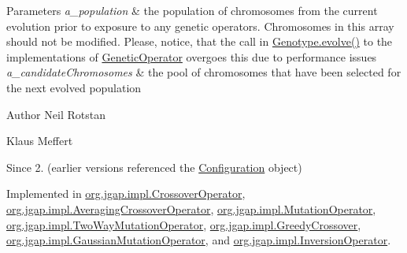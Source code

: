 \begin{DoxyParams}{Parameters}
{\em a\-\_\-population} & the population of chromosomes from the current evolution prior to exposure to any genetic operators. Chromosomes in this array should not be modified. Please, notice, that the call in \hyperlink{classorg_1_1jgap_1_1_genotype_a54a6791fbb6e13920e79f4e2dd719eb4}{Genotype.\-evolve()} to the implementations of \hyperlink{interfaceorg_1_1jgap_1_1_genetic_operator}{Genetic\-Operator} overgoes this due to performance issues \\
\hline
{\em a\-\_\-candidate\-Chromosomes} & the pool of chromosomes that have been selected for the next evolved population\\
\hline
\end{DoxyParams}
\begin{DoxyAuthor}{Author}
Neil Rotstan 

Klaus Meffert 
\end{DoxyAuthor}
\begin{DoxySince}{Since}
2. (earlier versions referenced the \hyperlink{classorg_1_1jgap_1_1_configuration}{Configuration} object) 
\end{DoxySince}


Implemented in \hyperlink{classorg_1_1jgap_1_1impl_1_1_crossover_operator_a271b82e98b398a42b576c956350d905e}{org.\-jgap.\-impl.\-Crossover\-Operator}, \hyperlink{classorg_1_1jgap_1_1impl_1_1_averaging_crossover_operator_a6acef66720d9c62e2be2f570bd0755f9}{org.\-jgap.\-impl.\-Averaging\-Crossover\-Operator}, \hyperlink{classorg_1_1jgap_1_1impl_1_1_mutation_operator_a4a1c852770559bba4ffa3e9718f4a0d8}{org.\-jgap.\-impl.\-Mutation\-Operator}, \hyperlink{classorg_1_1jgap_1_1impl_1_1_two_way_mutation_operator_a53ac73cd4e6b197e6756d4efe02bd01e}{org.\-jgap.\-impl.\-Two\-Way\-Mutation\-Operator}, \hyperlink{classorg_1_1jgap_1_1impl_1_1_greedy_crossover_a57adb8d442035ecae43e194f29dff43c}{org.\-jgap.\-impl.\-Greedy\-Crossover}, \hyperlink{classorg_1_1jgap_1_1impl_1_1_gaussian_mutation_operator_aa33da8cc4da351383f79ddaae90e988a}{org.\-jgap.\-impl.\-Gaussian\-Mutation\-Operator}, and \hyperlink{classorg_1_1jgap_1_1impl_1_1_inversion_operator_a7947681b60c19a585b1e0ee4595f625b}{org.\-jgap.\-impl.\-Inversion\-Operator}.



